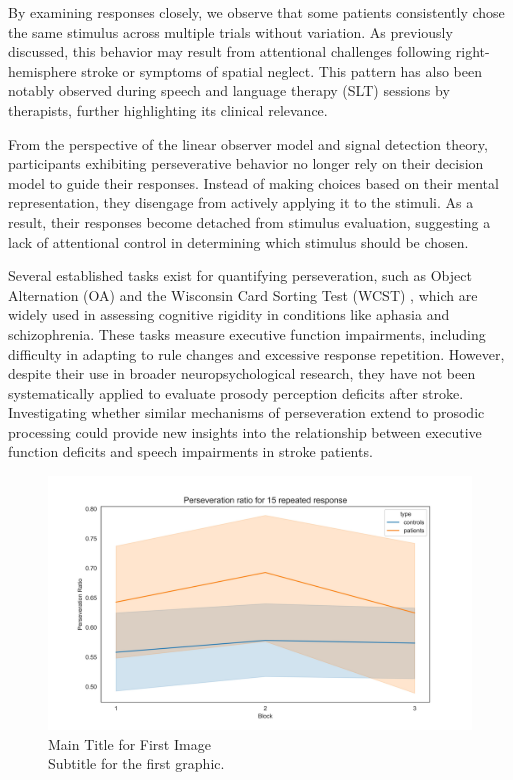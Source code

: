 By examining responses closely, we observe that some patients consistently chose the same stimulus across multiple trials without variation. As previously discussed, this behavior may result from attentional challenges following right-hemisphere stroke or symptoms of spatial neglect. This pattern has also been notably observed during speech and language therapy (SLT) sessions by therapists, further highlighting its clinical relevance. 

From the perspective of the linear observer model and signal detection theory, participants exhibiting perseverative behavior no longer rely on their decision model to guide their responses. Instead of making choices based on their mental representation, they disengage from actively applying it to the stimuli. As a result, their responses become detached from stimulus evaluation, suggesting a lack of attentional control in determining which stimulus should be chosen.

Several established tasks exist for quantifying perseveration, such as Object Alternation (OA) \cite{freedman_orbitofrontal_1998} and the Wisconsin Card Sorting Test (WCST) \cite{abbruzzese_performance_1996}, which are widely used in assessing cognitive rigidity in conditions like aphasia and schizophrenia. These tasks measure executive function impairments, including difficulty in adapting to rule changes and excessive response repetition. However, despite their use in broader neuropsychological research, they have not been systematically applied to evaluate prosody perception deficits after stroke. Investigating whether similar mechanisms of perseveration extend to prosodic processing could provide new insights into the relationship between executive function deficits and speech impairments in stroke patients.

\begin{figure}[ht!]
    \centering
    \includegraphics[width=15cm]{MainLayout/Images/chapter5/perseveration_block.jpg}
    \caption{Main Title for First Image \\ \small Subtitle for the first graphic.}
    \label{fig:perseveration_block}
\end{figure}
